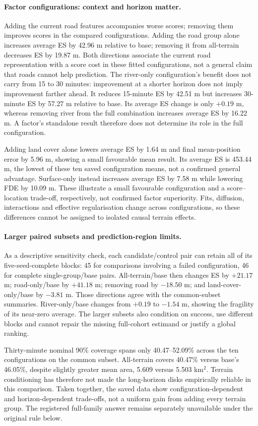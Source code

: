 \paragraph{Factor configurations: context and horizon matter.}
Adding the current road features accompanies worse scores; removing them
improves scores in the compared configurations.
Adding the road group alone increases average ES by 42.96 m relative to
base; removing it from all-terrain decreases ES by 19.87 m. Both directions
associate the current road representation with a score cost in these fitted
configurations, not a general claim that roads cannot help prediction.
The river-only configuration's benefit does not carry from 15 to 30 minutes:
improvement at a shorter horizon does not imply improvement farther ahead.
It reduces 15-minute ES by 42.51 m but increases
30-minute ES by 57.27 m relative to base. Its average ES change is only
$+0.19$ m, whereas removing river from the full combination increases
average ES by 16.22 m. A factor's standalone result therefore does not
determine its role in the full configuration.

Adding land cover alone lowers average ES by 1.64 m and final mean-position
error by 5.96 m, showing a small favourable mean result. Its average ES is
453.44 m, the lowest of these ten saved configuration means, not a confirmed
general advantage. Surface-only instead increases average ES by 7.58 m while
lowering FDE by 10.09 m. These illustrate a small favourable configuration
and a score--location trade-off, respectively, not confirmed factor
superiority. Fits, diffusion, interactions and effective regularisation
change across configurations, so these differences cannot be assigned to
isolated causal terrain effects.

\paragraph{Larger paired subsets and prediction-region limits.}
As a descriptive sensitivity check, each candidate/control pair can retain
all of its five-seed-complete blocks: 45 for comparisons involving a failed
configuration, 46 for complete single-group/base pairs. All-terrain/base
then changes ES by $+21.17$ m; road-only/base by $+41.18$ m; removing road
by $-18.50$ m; and land-cover-only/base by $-3.81$ m. Those directions agree
with the common-subset summaries. River-only/base changes from $+0.19$ to
$-1.54$ m, showing the fragility of its near-zero average. The larger subsets
also condition on success, use different blocks and cannot repair the
missing full-cohort estimand or justify a global ranking.

Thirty-minute nominal 90\% coverage spans only 40.47--52.09\% across the ten
configurations on the common subset. All-terrain covers 40.47\% versus
base's 46.05\%, despite slightly greater mean area, 5.609 versus 5.503
km$^2$. Terrain conditioning has therefore not made the long-horizon disks
empirically reliable in this comparison. Taken together, the saved data
show configuration-dependent and horizon-dependent trade-offs, not a
uniform gain from adding every terrain group. The registered full-family
answer remains separately unavailable under the original rule below.
